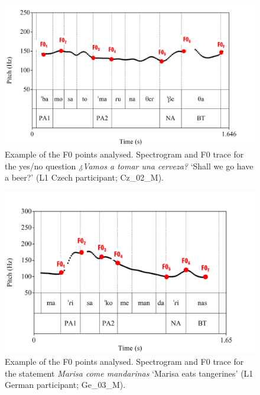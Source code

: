 \begin{figure}[p]
\includegraphics[width=\textwidth]{figures/a03HabilMethodology-img009.pdf}
\caption{Example of the F0 points analysed. Spectrogram and F0 trace for the yes/no question \textit{¿Vamos a tomar una cerveza?} ‘Shall we go have a beer?’ (L1 Czech participant; Cz\_02\_M).}
\label{fig:3.9}
\end{figure}


\begin{figure}[p]
\includegraphics[width=\textwidth]{figures/a03HabilMethodology-img010.pdf}

\caption{Example of the F0 points analysed. Spectrogram and F0 trace for the statement \textit{Marisa come mandarinas} ‘Marisa eats tangerines’ (L1 German participant; Ge\_03\_M).}
\label{fig:3.10}
\end{figure}

